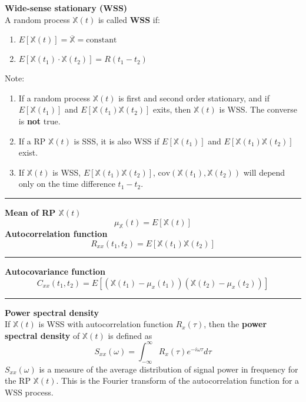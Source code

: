 \documentclass{article}
\providecommand{\X}{\mathbb{X}}
\begin{document}
\begin{multicols*}{3}
        \textbf{Wide-sense stationary (WSS)}\\
        A random process $\X(t)$ is called \textbf{WSS} if:
        \begin{enumerate}
            \item $E[\X(t)] = \overline{\X} = \text{constant}$
            \item $E[\X(t_1)\cdot \X(t_2)] = R(t_1 - t_2)$
        \end{enumerate}
        Note:
        \begin{enumerate}
            \item If a random process $\X(t)$ is first and second order stationary, and if $E[\X(t_1)]$ and $E[\X(t_1)\X(t_2)]$ exits, then $\X(t)$ is WSS. The converse is \textbf{not} true.
            \item If a RP $\X(t)$ is SSS, it is also WSS if $E[\X(t_1)]$ and $E[\X(t_1)\X(t_2)]$ exist.
            \item If $\X(t)$ is WSS, $E[\X(t_1)\X(t_2)]$, $\text{cov}(\X(t_1),\X(t_2))$ will depend only on the time difference $t_1 - t_2$.
        \end{enumerate}

        \noindent\rule{\columnwidth}{0.4pt}

        \textbf{Mean of RP $\X(t)$}
        \begin{equation*}
            \mu_{\X}(t) = E[\X(t)]
        \end{equation*}
        \textbf{Autocorrelation function}
        \begin{equation*}
            R_{xx}(t_1, t_2) = E[{\X(t_1)\X(t_2)}]
        \end{equation*}

        \noindent\rule{\columnwidth}{0.4pt}

        \textbf{Autocovariance function}
        \begin{equation*}
            C_{xx}(t_1,t_2) = E[(\X(t_1) - \mu_x(t_1))(\X(t_2) - \mu_x(t_2))]
        \end{equation*}

        \noindent\rule{\columnwidth}{0.4pt}

        \textbf{Power spectral density}\\
        If $\X(t)$ is WSS with autocorrelation function $R_x(\tau)$, then the \textbf{power spectral density} of $\X(t)$ is defined as
        \begin{equation*}
            S_{xx}(\omega) = \int_{-\infty}^{\infty} R_x(\tau)e^{-i\omega\tau}d\tau
        \end{equation*}
        $S_{xx}(\omega)$ is a measure of the average distribution of signal power in frequency for the RP $\X(t)$.
        This is the Fourier transform of the autocorrelation function for a WSS process.


\end{multicols*}
\end{document}
